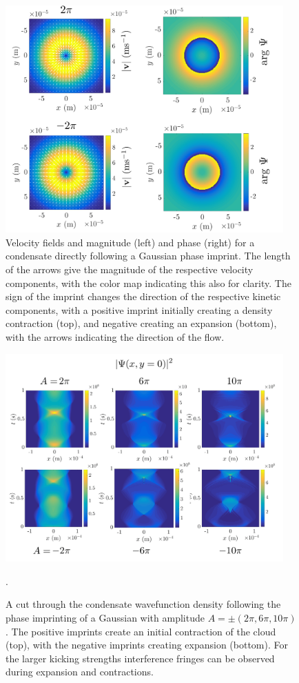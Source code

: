 \begin{figure}\centering
    \includegraphics[width=0.95\textwidth]{Images/ch4_vtx/velocity/gaussian_imprint}
    \caption{Velocity fields and magnitude (left) and phase (right) for a condensate directly following a Gaussian phase imprint. The length of the arrows give the magnitude of the respective velocity components, with the color map indicating this also for clarity. The sign of the imprint changes the direction of the respective kinetic components, with a positive imprint initially creating a density contraction (top), and negative creating an expansion (bottom), with the arrows indicating the direction of the flow.}\label{fig:gaussian}
\end{figure}

\begin{figure}\centering
    \includegraphics[width=0.95\textwidth]{Images/ch4_vtx/gaussian_imprint_B}
    \caption{A cut through the condensate wavefunction density following the phase imprinting of a Gaussian with amplitude $A=\pm(2\pi,6\pi,10\pi)$. The positive imprints create an initial contraction of the cloud (top), with the negative imprints creating expansion (bottom). For the larger kicking strengths interference fringes can be observed during expansion and contractions.}.\label{fig:gaussian_wfc}
\end{figure}


